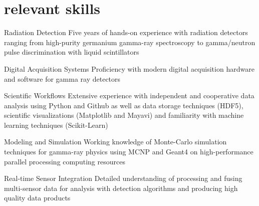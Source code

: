 \documentclass[print]{resume} %
\begin{document}

\section{relevant skills}
\begin{DESCRIPTION}
	\item[Radiation Detection] Five years of hands-on experience with radiation detectors ranging from high-purity germanium gamma-ray spectroscopy to gamma/neutron pulse discrimination with liquid scintillators
	\item[Digital Acquisition Systems] Proficiency with modern digital acquisition hardware and software for gamma ray detectors
	\item[Scientific Workflows] Extensive experience with independent and cooperative data analysis using Python and Github as well as data storage techniques (HDF5), scientific visualizations (Matplotlib and Mayavi) and familiarity with machine learning techniques (Scikit-Learn)
	\item[Modeling and Simulation] Working knowledge of Monte-Carlo simulation techniques for gamma-ray physics using MCNP and Geant4 on high-performance parallel processing computing resources
	\item[Real-time Sensor Integration] Detailed understanding of processing and fusing multi-sensor data for analysis with detection algorithms and producing high quality data products
\end{DESCRIPTION}
\end{document}

